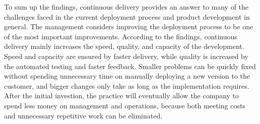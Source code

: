 \documentclass[english, grading]{tktltiki2}
\theoremstyle{definition}
\theoremstyle{remark}
\begin{document}


To sum up the findings, continuous delivery provides an answer to many of the challenges faced in the current deployment process and product development in general. The management considers improving the deployment process to be one of the most important improvements. According to the findings, continuous delivery mainly increases the speed, quality, and capacity of the development. Speed and capacity are ensured by faster delivery, while quality is increased by the automated testing and faster feedback. Smaller problems can be quickly fixed without spending unnecessary time on manually deploying a new version to the customer, and bigger changes only take as long as the implementation requires. After the initial investion, the practice will eventually allow the company to spend less money on management and operations, because both meeting costs and unnecessary repetitive work can be eliminated. %





%

\end{document}
